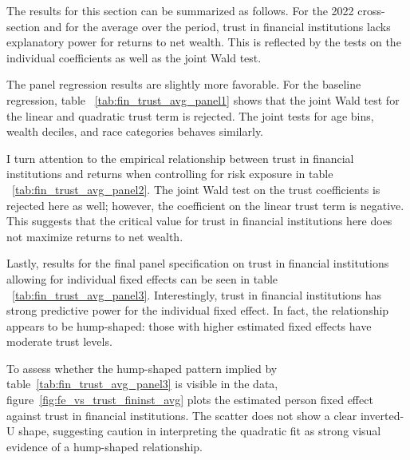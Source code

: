 \label{tab:fin_trust_components_corr}
\FloatBarrier

\par The results for this section can be summarized as follows. For the 2022 cross-section and for the average over the period, trust in financial institutions lacks explanatory power for returns to net wealth. This is reflected by the tests on the individual coefficients as well as the joint Wald test.

\par The panel regression results are slightly more favorable. For the baseline regression, table ~\ref{tab:fin_trust_avg_panel1} shows that the joint Wald test for the linear and quadratic trust term is rejected. The joint tests for age bins, wealth deciles, and race categories behaves similarly.

\label{tab:fin_trust_avg_panel1}
\FloatBarrier

\par I turn attention to the empirical relationship between trust in financial institutions and returns when controlling for risk exposure in table ~\ref{tab:fin_trust_avg_panel2}. The joint Wald test on the trust coefficients is rejected here as well; however, the coefficient on the linear trust term is negative. This suggests that the critical value for trust in financial institutions here does not maximize returns to net wealth.

\label{tab:fin_trust_avg_panel2}
\FloatBarrier

\par Lastly, results for the final panel specification on trust in financial institutions allowing for individual fixed effects can be seen in table ~\ref{tab:fin_trust_avg_panel3}. Interestingly, trust in financial institutions has strong predictive power for the individual fixed effect. In fact, the relationship appears to be hump-shaped: those with higher estimated fixed effects have moderate trust levels. 

\label{tab:fin_trust_avg_panel3}
\FloatBarrier

\par To assess whether the hump-shaped pattern implied by table~\ref{tab:fin_trust_avg_panel3} is visible in the data, figure~\ref{fig:fe_vs_trust_fininst_avg} plots the estimated person fixed effect against trust in financial institutions. The scatter does not show a clear inverted-U shape, suggesting caution in interpreting the quadratic fit as strong visual evidence of a hump-shaped relationship.

